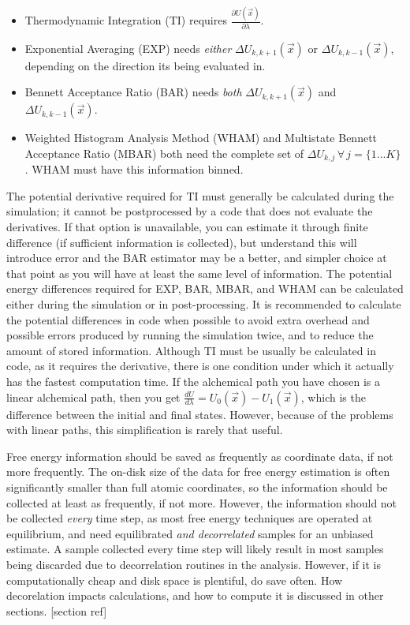 \documentclass[9pt,bestpractices]{livecoms}
\begin{document}
\begin{itemize}
    \item Thermodynamic Integration (TI) requires $\frac{\partial U(\vec{x})}{\partial\lambda}$.
    \item Exponential Averaging (EXP) needs \textit{either} $\Delta U_{k,k+1}(\vec{x})$ or $\Delta U_{k,k-1}(\vec{x})$, depending on the direction its being evaluated in.
    \item Bennett Acceptance Ratio (BAR) needs \textit{both} $\Delta U_{k,k+1}(\vec{x})$ and $\Delta U_{k,k-1}(\vec{x})$.
    \item Weighted Histogram Analysis Method (WHAM) and Multistate Bennett Acceptance Ratio (MBAR) both need the complete set of $\Delta U_{k,j} \, \forall \, j=\{1...K\}$. WHAM must have this information binned.
\end{itemize}

The potential derivative required for TI must generally be calculated during the simulation; it cannot be postprocessed by a code that does not evaluate the derivatives. 
If that option is unavailable, you can estimate it through finite difference (if sufficient information is collected), but understand this will introduce error and the BAR estimator may be a better, and simpler choice at that point as you will have at least the same level of information. 
The potential energy differences required for EXP, BAR, MBAR, and WHAM can be calculated either during the simulation or in post-processing. It is recommended to calculate the potential differences in code when possible to avoid extra overhead and possible errors produced by running the simulation twice, and to reduce the amount of stored information. 
Although TI must be usually be calculated in code, as it requires the derivative, there is one condition under which it actually has the fastest computation time. 
If the alchemical path you have chosen is a linear alchemical path, then you get $\frac{dU}{d\lambda} = U_0(\vec{x}) - U_1(\vec{x})$, which is the difference between the initial and final states. 
However, because of the problems with linear paths, this simplification is rarely that useful.

Free energy information should be saved as frequently as coordinate data, if not more frequently. 
The on-disk size of the data for free energy estimation is often significantly smaller than full atomic coordinates, so the information should be collected at least as frequently, if not more. 
However, the information should not be collected \textit{every} time step, as most free energy techniques are operated at equilibrium, and need equilibrated \textit{and decorrelated} samples for an unbiased estimate.
A sample collected every time step will likely result in most samples being discarded due to decorrelation routines in the analysis. However, if it is computationally cheap and disk space is plentiful, do save often. 
How decorelation impacts calculations, and how to compute it is discussed in other sections. [section ref]
\end{document}
